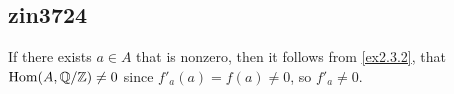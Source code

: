 \subsection{zin3724}
If there exists $a\in A$ that is nonzero, then it follows from \ref{ex2.3.2}, that $\operatorname{\operatorname{Hom}}(A,\mathbb{Q}/\mathbb{Z})\ne0$ since $f'_a(a)=f(a)\ne0$, so $f'_a\ne0$.